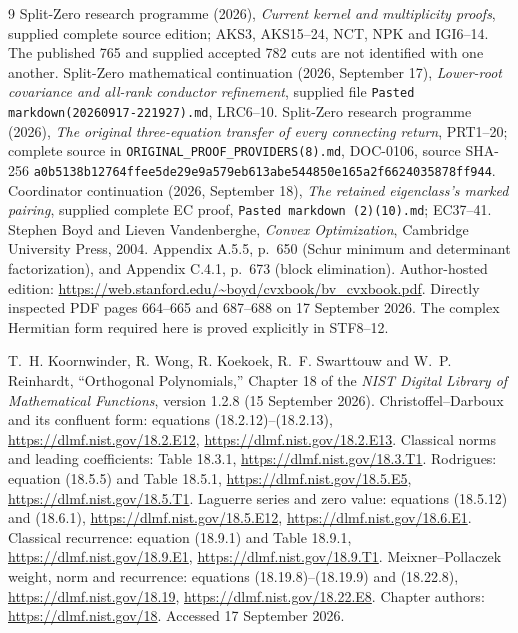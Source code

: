 \documentclass[11pt,a4paper]{article}
\begin{document}
\begin{thebibliography}{9}
 Split-Zero research programme (2026), \emph{Current kernel and multiplicity proofs}, supplied complete source edition; AKS3, AKS15--24, NCT, NPK and IGI6--14. The published 765 and supplied accepted 782 cuts are not identified with one another.
 Split-Zero mathematical continuation (2026, September 17), \emph{Lower-root covariance and all-rank conductor refinement}, supplied file \texttt{Pasted markdown(20260917-221927).md}, LRC6--10.
 Split-Zero research programme (2026), \emph{The original three-equation transfer of every connecting return}, PRT1--20; complete source in \texttt{ORIGINAL\_PROOF\_PROVIDERS(8).md}, DOC-0106, source SHA-256 \texttt{a0b5138b12764ffee5de29e9a579eb613abe544850e165a2f6624035878ff944}.
 Coordinator continuation (2026, September 18), \emph{The retained eigenclass's marked pairing}, supplied complete EC proof, \texttt{Pasted markdown (2)(10).md}; EC37--41.
Stephen Boyd and Lieven Vandenberghe,
\emph{Convex Optimization}, Cambridge University Press, 2004.
Appendix A.5.5, p.~650 (Schur minimum and determinant factorization),
and Appendix C.4.1, p.~673 (block elimination).
Author-hosted edition: \url{https://web.stanford.edu/~boyd/cvxbook/bv_cvxbook.pdf}.
Directly inspected PDF pages 664--665 and 687--688 on 17 September 2026.
The complex Hermitian form required here is proved explicitly in STF8--12.

T.~H. Koornwinder, R. Wong, R. Koekoek, R.~F. Swarttouw and
W.~P. Reinhardt,
``Orthogonal Polynomials,'' Chapter 18 of the
\emph{NIST Digital Library of Mathematical Functions},
version 1.2.8 (15 September 2026).
Christoffel--Darboux and its confluent form: equations (18.2.12)--(18.2.13),
\url{https://dlmf.nist.gov/18.2.E12},
\url{https://dlmf.nist.gov/18.2.E13}.
Classical norms and leading coefficients: Table 18.3.1,
\url{https://dlmf.nist.gov/18.3.T1}.
Rodrigues: equation (18.5.5) and Table 18.5.1,
\url{https://dlmf.nist.gov/18.5.E5},
\url{https://dlmf.nist.gov/18.5.T1}.
Laguerre series and zero value: equations (18.5.12) and (18.6.1),
\url{https://dlmf.nist.gov/18.5.E12},
\url{https://dlmf.nist.gov/18.6.E1}.
Classical recurrence: equation (18.9.1) and Table 18.9.1,
\url{https://dlmf.nist.gov/18.9.E1},
\url{https://dlmf.nist.gov/18.9.T1}.
Meixner--Pollaczek weight, norm and recurrence:
equations (18.19.8)--(18.19.9) and (18.22.8),
\url{https://dlmf.nist.gov/18.19},
\url{https://dlmf.nist.gov/18.22.E8}.
Chapter authors: \url{https://dlmf.nist.gov/18}.
Accessed 17 September 2026.



\end{thebibliography}
\end{document}
